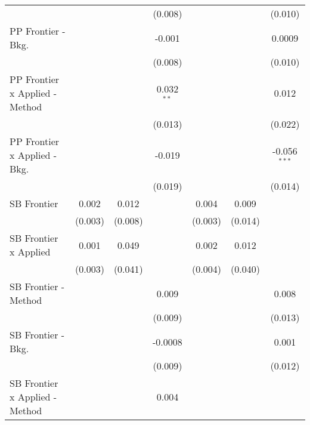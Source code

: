 \begin{tabular}{lcccccc}
                                  &               &                & (0.008)       &               &                & (0.010)\\   
   PP Frontier - Bkg.             &               &                & -0.001        &               &                & 0.0009\\   
                                  &               &                & (0.008)       &               &                & (0.010)\\   
   PP Frontier x Applied - Method &               &                & 0.032$^{**}$  &               &                & 0.012\\   
                                  &               &                & (0.013)       &               &                & (0.022)\\   
   PP Frontier x Applied - Bkg.   &               &                & -0.019        &               &                & -0.056$^{***}$\\   
                                  &               &                & (0.019)       &               &                & (0.014)\\   
   SB Frontier                    & 0.002         & 0.012          &               & 0.004         & 0.009          &   \\   
                                  & (0.003)       & (0.008)        &               & (0.003)       & (0.014)        &   \\   
   SB Frontier x Applied          & 0.001         & 0.049          &               & 0.002         & 0.012          &   \\   
                                  & (0.003)       & (0.041)        &               & (0.004)       & (0.040)        &   \\   
   SB Frontier - Method           &               &                & 0.009         &               &                & 0.008\\   
                                  &               &                & (0.009)       &               &                & (0.013)\\   
   SB Frontier - Bkg.             &               &                & -0.0008       &               &                & 0.001\\   
                                  &               &                & (0.009)       &               &                & (0.012)\\   
   SB Frontier x Applied - Method &               &                & 0.004         &               &                &   \\   

\end{tabular}
